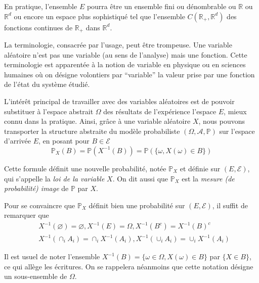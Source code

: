 En pratique, l'ensemble \(E\) pourra être un ensemble fini ou
dénombrable ou \(\mathbb{R}\) ou \(\mathbb{R}^d\) ou encore un espace
plus sophistiqué tel que l'ensemble \(C(\mathbb{R}_+ , \mathbb{R}^d)\)
des fonctions continues de \(\mathbb{R}_+\) dans \(\mathbb{R}^d\).

\begin{remarque}[{Vocabulaire}]\label{I-vocabulaire}

La terminologie, consacrée par l'usage, peut être trompeuse. Une
variable aléatoire n'est pas une variable (au sens de l'analyse) mais
une fonction. Cette terminologie est apparentée à la notion de variable
en physique ou en sciences humaines où on désigne volontiers par
``variable'' la valeur prise par une fonction de l'état du système
étudié.

L'intérêt principal de travailler avec des variables aléatoires est de
pouvoir substituer à l'espace abstrait \(\Omega\) des résultats de
l'expérience l'espace \(E\), mieux connu dans la pratique. Ainsi, grâce
à une variable aléatoire \(X\), nous pouvons transporter la structure
abstraite du modèle probabiliste \((\Omega, \mathcal{A}, \mathbb{P})\)
sur l'espace d'arrivée \(E\), en posant pour \(B \in \mathcal{E}\)
\[\mathbb{P}_X (B) = \mathbb{P}(X^{-1}(B)) = \mathbb{P}(\{\omega, X(\omega)\in B\})\]

Cette formule définit une nouvelle probabilité, notée \(\mathbb{P}_X\)
et définie sur \((E,\mathcal{E})\), qui s'appelle la \emph{loi de la
variable} \(X\). On dit aussi que \(\mathbb{P}_X\) est la \emph{mesure
(de probabilité) image} de \(\mathbb{P}\) par \(X\).

Pour se convaincre que \(\mathbb{P}_X\) définit bien une probabilité sur
\((E,\mathcal{E})\), il suffit de remarquer que \begin{align*}
& X^{-1}(\varnothing) = \varnothing, X^{-1}(E) = \Omega, X^{-1}(B^c) = X^{-1}(B)^c \\
& X^{-1}(\cap_i A_i) = \cap_i X^{-1}(A_i), X^{-1}(\cup_i A_i) = \cup_i X^{-1}(A_i)
\end{align*}
\end{remarque}

\begin{remarque}[{Notation}]\label{I-notation}

Il est usuel de noter l'ensemble
\(X^{-1}(B) = \{\omega \in \Omega, X(\omega) \in B\}\) par
\(\{X \in B\}\), ce qui allège les écritures. On se rappelera néanmoins
que cette notation désigne un sous-ensemble de \(\Omega\).
\end{remarque}


